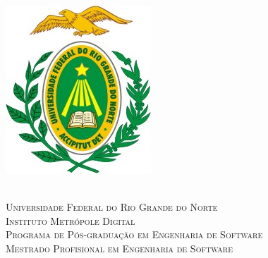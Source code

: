 
\begin{titlingpage}
	\begin{center}
		\begin{minipage}{2.2cm}
			\begin{center}
				\includegraphics[scale=1.2]{Imagens/Brasao-UFRN.jpg}
			\end{center}
		\end{minipage}
		\begin{minipage}{10.15cm}
			\begin{center}
					{\small \ \\
                       \textsc{Universidade Federal do Rio Grande do Norte}		   			\\
							  \textsc{Instituto Metrópole Digital}					\\
							  \textsc{Programa de Pós-graduação em Engenharia de Software}	\\
                       \textsc{Mestrado Profisional em Engenharia de Software}}   				\\
			\end{center}
		\end{minipage}
		\begin{minipage}{2.2cm}
			\begin{center}

\end{center}
\end{minipage}
\end{center}
\end{titlingpage}
